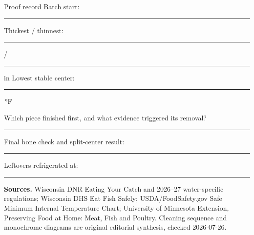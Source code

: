 \begin{teloscard}{Proof record}
Batch start: \rule{22mm}{.4pt}\quad
Thickest / thinnest: \rule{14mm}{.4pt} / \rule{14mm}{.4pt} in\quad
Lowest stable center: \rule{16mm}{.4pt}\,°F

\smallskip
Which piece finished first, and what evidence triggered its removal?
\par\noindent\rule{\linewidth}{.4pt}

\smallskip
Final bone check and split-center result:
\par\noindent\rule{\linewidth}{.4pt}

\smallskip
Leftovers refrigerated at: \rule{24mm}{.4pt}
\end{teloscard}

{\footnotesize\textbf{Sources.} Wisconsin DNR Eating Your Catch and 2026--27
water-specific regulations; Wisconsin DHS Eat Fish Safely; USDA/FoodSafety.gov
Safe Minimum Internal Temperature Chart; University of Minnesota Extension,
Preserving Food at Home: Meat, Fish and Poultry. Cleaning sequence and
monochrome diagrams are original editorial synthesis, checked 2026-07-26.}

